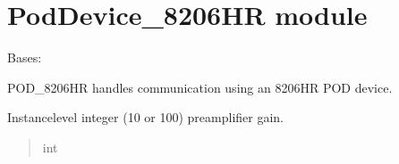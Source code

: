 \documentclass[letterpaper,10pt,english]{sphinxmanual}
\begin{document}
\sphinxstepscope


\section{PodDevice\_8206HR module}
\label{\detokenize{PodDevice_8206HR:module-PodDevice_8206HR}}\label{\detokenize{PodDevice_8206HR:poddevice-8206hr-module}}\label{\detokenize{PodDevice_8206HR::doc}}

\begin{fulllineitems}
\label{\detokenize{PodDevice_8206HR:PodDevice_8206HR.POD_8206HR}}
\pysigstartsignatures
{}
\pysigstopsignatures
\sphinxAtStartPar
Bases: {\hyperref[\detokenize{BasicPodProtocol:BasicPodProtocol.POD_Basics}]{}}

\sphinxAtStartPar
POD\_8206HR handles communication using an 8206HR POD device.

\begin{fulllineitems}
\label{\detokenize{PodDevice_8206HR:PodDevice_8206HR.POD_8206HR._preampGain}}
\pysigstartsignatures
{}
\pysigstopsignatures
\sphinxAtStartPar
Instance\sphinxhyphen{}level integer (10 or 100) preamplifier gain.
\begin{quote}\begin{description}
\sphinxAtStartPar
int

\end{description}\end{quote}


\end{fulllineitems}
\end{fulllineitems}
\end{document}
